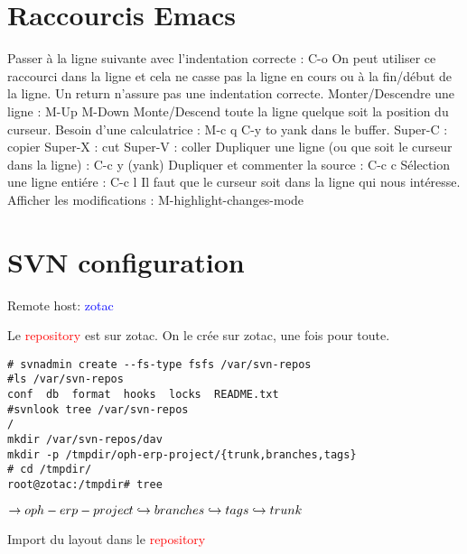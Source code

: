 \documentclass[12pt,a4paper]{article}
\begin{document}
\tableofcontents

\section{Raccourcis Emacs}
\label{sec:racemacs}

Passer à la ligne suivante avec l’indentation correcte : C-o
On peut utiliser ce raccourci dans la ligne et cela ne casse pas la ligne en cours ou à la fin/début de la ligne. Un return n’assure pas une
indentation correcte. Monter/Descendre une ligne : M-Up M-Down
Monte/Descend toute la ligne quelque soit la position du curseur.
Besoin d’une calculatrice : M-c q
C-y to yank dans le buffer.
Super-C : copier
Super-X : cut
Super-V : coller
Dupliquer une ligne (ou que soit le curseur dans la ligne) : C-c y (yank)
Dupliquer et commenter la source : C-c c
Sélection une ligne entiére : C-c l
Il faut que le curseur soit dans la ligne qui nous intéresse.
Afficher les modifications : M-highlight-changes-mode




\section{SVN configuration}






Remote host: \textcolor{blue}{zotac}

Le \textcolor{red}{repository} est sur zotac. On le crée sur zotac, une fois pour toute.

\begin{verbatim}
# svnadmin create --fs-type fsfs /var/svn-repos
#ls /var/svn-repos
conf  db  format  hooks  locks  README.txt
#svnlook tree /var/svn-repos
/
mkdir /var/svn-repos/dav
mkdir -p /tmpdir/oph-erp-project/{trunk,branches,tags}
# cd /tmpdir/
root@zotac:/tmpdir# tree
\end{verbatim}

$\rightarrow oph-erp-project\\
    \hookrightarrow branches\\
    \hookrightarrow tags\\
    \hookrightarrow trunk\\$


Import du layout dans le  \textcolor{red}{repository}
\end{document}
